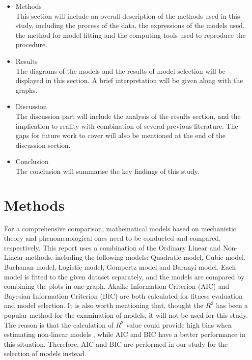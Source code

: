 \documentclass[11pt, oneside]{article}
\begin{document}
	\begin{itemize}
	\item Methods
	\\This section will include an overall description of the methods used in this study, including the process of the data, the expressions of the models used, the method for model fitting and the computing tools used to reproduce the procedure.
	\item Results
	\\The diagrams of the models and the results of model selection will be displayed in this section. A brief interpretation will be given along with the graphs.
	\item Discussion
	\\The discussion part will include the analysis of the results section, and the implication to reality with combination of several previous literature. The gaps for future work to cover will also be mentioned at the end of the discussion section.
	\item Conclusion
	\\The conclusion will summarise the key findings of this study.
	\end{itemize}

	\pagebreak

	\section{Methods}


	For a comprehensive comparison, mathematical models based on mechanistic theory and phenomenological ones need to be conducted and compared, respectively. This report uses a combination of the Ordinary Linear and Non-Linear methods, including the following models: Quadratic model, Cubic model, Buchanan model, Logistic model, Gompertz model and Baranyi model. Each model is fitted to the given dataset separately, and the models are compared by combining the plots in one graph. Akaike Information Criterion (AIC) and Bayesian Information Criterion (BIC) are both calculated for fitness evaluation and model selection. It is also worth mentioning that, thought the \(R^2\) has been a popular method for the examination of models, it will not be used for this study. The reason is that the calculation of \(R^2\) value could provide high bias when estimating non-linear models \cite{Spiess and Neumeyer}, while AIC and BIC have a better performance in this situation. Therefore, AIC and BIC are performed in our study for the selection of models instead.
\end{document}
